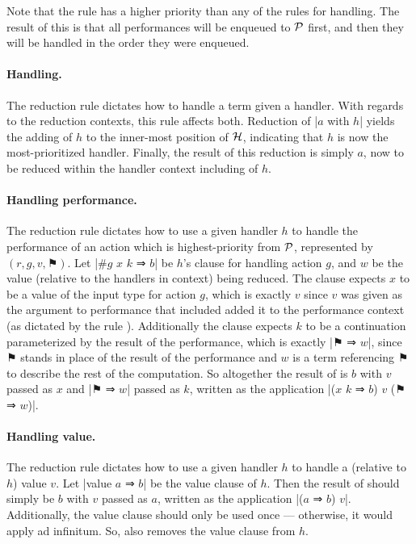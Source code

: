 Note that the rule  has a higher priority than any of the rules for handling.
The result of this is that all performances will be enqueued to $\mathcal{P}$ first,
and then they will be handled in the order they were enqueued.

\paragraph{Handling.}
The reduction rule  dictates how to handle a term given a handler.
With regards to the reduction contexts, this rule affects both.
Reduction of \code|$a$ with $h$| yields the adding of $h$ to the inner-most position of $\mathcal{H}$, indicating that $h$ is now the most-prioritized handler.
Finally, the result of this reduction is simply $a$, now to be reduced within the handler context including of $h$.

\paragraph{Handling performance.}
The reduction rule  dictates how to use a given handler $h$ to handle the performance of an action which is highest-priority from $\mathcal{P}$, represented by $(r,g,v,⚑)$.
Let \code|#$g$ $x$ $k$ ⇒ $b$| be $h$'s clause for handling action $g$,
and $w$ be the value (relative to the handlers in context) being reduced.
The clause expects $x$ to be a value of the input type for action $g$, which is exactly $v$ since $v$ was given as the argument to performance that included added it to the performance context (as dictated by the rule ).
Additionally the clause expects $k$ to be a continuation parameterized by the result of the performance, which is exactly \code|$⚑$ ⇒ $w$|, since $⚑$ stands in place of the result of the performance and $w$ is a term referencing $⚑$ to describe the rest of the computation.
So altogether the result of  is $b$ with $v$ passed as $x$ and \code|$⚑$ ⇒ $w$| passed as $k$,
written as the application \code|($x$ $k$ ⇒ $b$) $v$ ($⚑$ ⇒ $w$)|.

\paragraph{Handling value.}
The reduction rule  dictates how to use a given handler $h$ to handle a (relative to $h$) value $v$.
Let \code|value $a$ ⇒ $b$| be the value clause of $h$.
Then the result of  should simply be $b$ with $v$ passed as $a$,
written as the application \code|($a$ ⇒ $b$) $v$|.
Additionally, the value clause should only be used once --- otherwise, it would apply ad infinitum.
So,  also removes the value clause from $h$.

